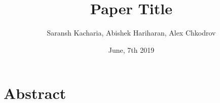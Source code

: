 \documentclass[11pt,oneside]{article}
\title{Paper Title}
\author{Saransh Kacharia, Abishek Hariharan, Alex Chkodrov}
\date{June, 7th 2019}
\begin{document}
\maketitle
\pagestyle{fancy}
\section*{Abstract}
\end{document}
